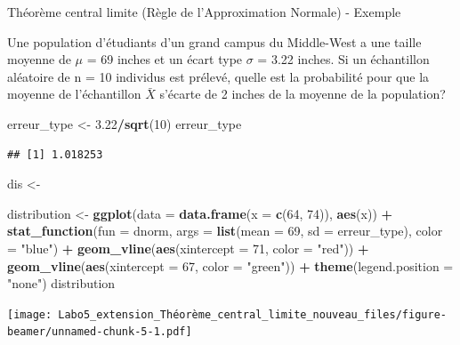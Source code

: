 \documentclass[ignorenonframetext,]{beamer}
\newenvironment{Shaded}{\begin{snugshade}}{\end{snugshade}}
\newcommand{\KeywordTok}[1]{\textcolor[rgb]{0.13,0.29,0.53}{\textbf{#1}}}
\newcommand{\DataTypeTok}[1]{\textcolor[rgb]{0.13,0.29,0.53}{#1}}
\newcommand{\DecValTok}[1]{\textcolor[rgb]{0.00,0.00,0.81}{#1}}
\newcommand{\FloatTok}[1]{\textcolor[rgb]{0.00,0.00,0.81}{#1}}
\newcommand{\StringTok}[1]{\textcolor[rgb]{0.31,0.60,0.02}{#1}}
\newcommand{\OperatorTok}[1]{\textcolor[rgb]{0.81,0.36,0.00}{\textbf{#1}}}
\newcommand{\NormalTok}[1]{#1}
\begin{document}
\begin{frame}[fragile]{Théorème central limite (Règle de l'Approximation
Normale) - Exemple}

Une population d'étudiants d'un grand campus du Middle-West a une taille
moyenne de \(\mu\) = 69 inches et un écart type \(\sigma\) = 3.22
inches. Si un échantillon aléatoire de n = 10 individus est prélevé,
quelle est la probabilité pour que la moyenne de l'échantillon
\(\bar{X}\) s'écarte de 2 inches de la moyenne de la population?

\begin{Shaded}
\begin{Highlighting}[]
\NormalTok{erreur_type <-}\StringTok{ }\FloatTok{3.22}\OperatorTok{/}\KeywordTok{sqrt}\NormalTok{(}\DecValTok{10}\NormalTok{)}
\NormalTok{erreur_type}
\end{Highlighting}
\end{Shaded}

\begin{verbatim}
## [1] 1.018253
\end{verbatim}

\begin{Shaded}
\begin{Highlighting}[]
\NormalTok{dis <-}\StringTok{ }

\NormalTok{distribution <-}
\StringTok{  }\KeywordTok{ggplot}\NormalTok{(}\DataTypeTok{data =} \KeywordTok{data.frame}\NormalTok{(}\DataTypeTok{x =} \KeywordTok{c}\NormalTok{(}\DecValTok{64}\NormalTok{, }\DecValTok{74}\NormalTok{)), }\KeywordTok{aes}\NormalTok{(x)) }\OperatorTok{+}
\StringTok{  }\KeywordTok{stat_function}\NormalTok{(}\DataTypeTok{fun =}\NormalTok{ dnorm, }\DataTypeTok{args =} \KeywordTok{list}\NormalTok{(}\DataTypeTok{mean =} \DecValTok{69}\NormalTok{, }\DataTypeTok{sd =}\NormalTok{ erreur_type), }\DataTypeTok{color =} \StringTok{"blue"}\NormalTok{) }\OperatorTok{+}
\StringTok{  }\KeywordTok{geom_vline}\NormalTok{(}\KeywordTok{aes}\NormalTok{(}\DataTypeTok{xintercept =} \DecValTok{71}\NormalTok{, }\DataTypeTok{color =} \StringTok{"red"}\NormalTok{)) }\OperatorTok{+}
\StringTok{  }\KeywordTok{geom_vline}\NormalTok{(}\KeywordTok{aes}\NormalTok{(}\DataTypeTok{xintercept =} \DecValTok{67}\NormalTok{, }\DataTypeTok{color =} \StringTok{"green"}\NormalTok{)) }\OperatorTok{+}
\StringTok{  }\KeywordTok{theme}\NormalTok{(}\DataTypeTok{legend.position =} \StringTok{"none"}\NormalTok{)}
\NormalTok{distribution}
\end{Highlighting}
\end{Shaded}

\texttt{[image: Labo5\_extension\_Théorème\_central\_limite\_nouveau\_files/figure-beamer/unnamed-chunk-5-1.pdf]}

\end{frame}
\end{document}
